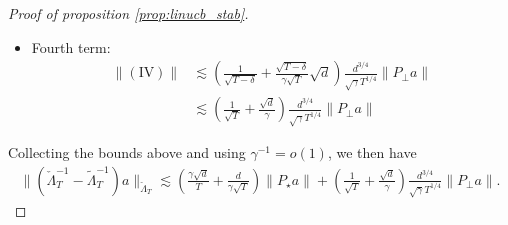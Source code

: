 \documentclass[11pt]{article}
\begin{document}
\begin{proof}[Proof of proposition \ref{prop:linucb_stab}]
\begin{itemize}
\item Fourth term:
\begin{align*}
    \|(\mathrm{IV})\| &\lesssim \left(\frac{1}{\sqrt{T - \delta}} + \frac{\sqrt{T - \delta}}{\gamma \sqrt{T}} \sqrt{d} \right) \frac{d^{3/4}}{\sqrt{\gamma} T^{1/4}} \| P_\perp a \| \\ 
    &\lesssim \left( \frac{1}{\sqrt{T}} + \frac{\sqrt{d}}{\gamma} \right) \frac{d^{3/4}}{\sqrt{\gamma} T^{1/4}} \| P_\perp a \|
\end{align*}
\end{itemize}
Collecting the bounds above and using $\gamma^{-1} =o(1)$, we then have
\begin{align*}
    \| \left( \check \Lambda_T^{-1} - \widetilde \Lambda_T^{-1} \right) a \|_{\check \Lambda_T} \lesssim \left( \frac{\gamma \sqrt{d}}{T} + \frac{d}{\gamma \sqrt{T}}\right) \|P_\star a \|+ \left( \frac{1}{\sqrt{T}} + \frac{\sqrt{d}}{\gamma} \right) \frac{d^{3/4}}{\sqrt{\gamma} T^{1/4}} \| P_\perp a \|.
\end{align*}


\end{proof}
\end{document}
